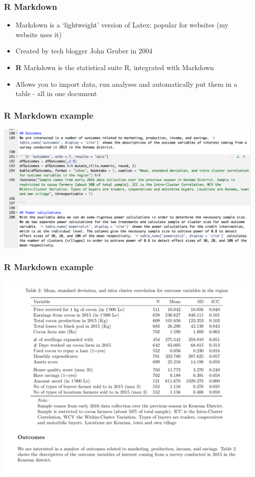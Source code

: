 \documentclass{beamer}
\begin{document}
\begin{frame}[t]\frametitle{R Markdown}
	\begin{itemize}
		\item Markdown is a `lightweight' version of Latex: popular for websites (my website uses it)
		\item Created by tech blogger John Gruber in 2004
		\item \textbf{R} Markdown is the statistical suite R, integrated with Markdown
		\item Allows you to import data, run analyses and automatically put them in a table - all in one document
	\end{itemize}
\end{frame}

\begin{frame}[t]\frametitle{R Markdown example}
    \centering\includegraphics[width=\textwidth]{rmarkdown_example1.png}
\end{frame}

\begin{frame}[t]\frametitle{R Markdown example}
    \centering\includegraphics[height=0.8\textheight]{rmarkdown_example2.png}
\end{frame}
\end{document}
